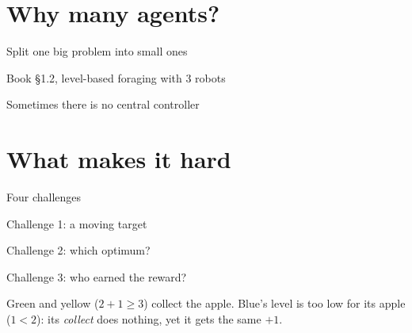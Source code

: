 \documentclass[aspectratio=169,11pt]{beamer}
\begin{document}
\section{Why many agents?}

\begin{frame}{Split one big problem into small ones}
  \centering
  
  \par{\scriptsize\color{cgray} Book \S1.2, level-based foraging with 3 robots}
\end{frame}

\begin{frame}{Sometimes there is no central controller}
  \centering
  
  \par{}
\end{frame}

\section{What makes it hard}

\begin{frame}{Four challenges}
  \centering
  
  \par{}
\end{frame}

\begin{frame}{Challenge 1: a moving target}
  \centering
  
  \par{}
\end{frame}

\begin{frame}{Challenge 2: which optimum?}
  \centering
  
  \par\bigskip
  \par{}
\end{frame}

\begin{frame}{Challenge 3: who earned the reward?}
  \centering
  
  \par\bigskip
  {\small Green and yellow ($2 + 1 \ge 3$) collect the apple. Blue's level is too low for its apple ($1 < 2$): its \emph{collect} does nothing, yet it gets the same $+1$.}
  \par{}
\end{frame}
\end{document}
